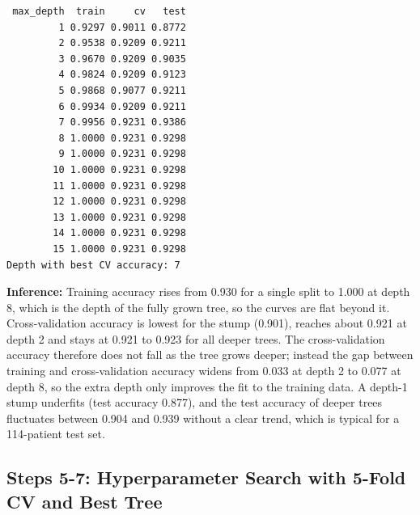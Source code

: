 \documentclass[11pt]{article}
\begin{document}
\begin{verbatim}
 max_depth  train     cv   test
         1 0.9297 0.9011 0.8772
         2 0.9538 0.9209 0.9211
         3 0.9670 0.9209 0.9035
         4 0.9824 0.9209 0.9123
         5 0.9868 0.9077 0.9211
         6 0.9934 0.9209 0.9211
         7 0.9956 0.9231 0.9386
         8 1.0000 0.9231 0.9298
         9 1.0000 0.9231 0.9298
        10 1.0000 0.9231 0.9298
        11 1.0000 0.9231 0.9298
        12 1.0000 0.9231 0.9298
        13 1.0000 0.9231 0.9298
        14 1.0000 0.9231 0.9298
        15 1.0000 0.9231 0.9298
Depth with best CV accuracy: 7
\end{verbatim}

\textbf{Inference:} Training accuracy rises from 0.930 for a single split to 1.000 at depth 8, which is the
depth of the fully grown tree, so the curves are flat beyond it. Cross-validation accuracy
is lowest for the stump (0.901), reaches about 0.921 at depth 2 and stays at 0.921 to 0.923
for all deeper trees. The cross-validation accuracy therefore does not fall as the tree
grows deeper; instead the gap between training and cross-validation accuracy widens from
0.033 at depth 2 to 0.077 at depth 8, so the extra depth only improves the fit to the
training data. A depth-1 stump underfits (test accuracy 0.877), and the test accuracy of
deeper trees fluctuates between 0.904 and 0.939 without a clear trend, which is typical for
a 114-patient test set.

\subsection*{Steps 5-7: Hyperparameter Search with 5-Fold CV and Best Tree}
\label{sec:org06e8e67}
\end{document}
